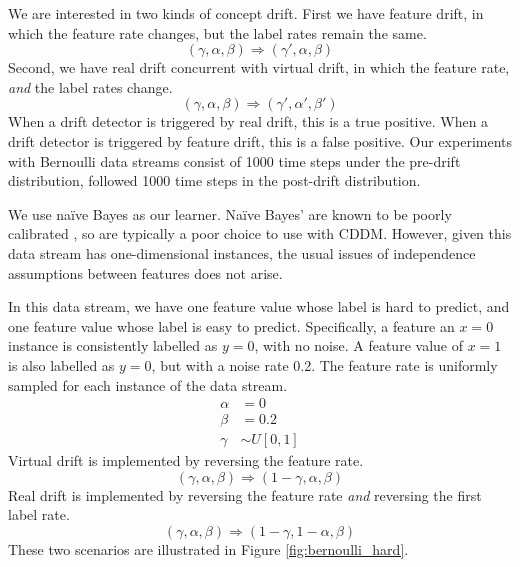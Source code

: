 We are interested in two kinds of concept drift. First we have feature drift, in which the feature rate changes, but the label rates remain the same.
\begin{equation}
  (\gamma,\alpha,\beta) \Rightarrow (\gamma',\alpha,\beta)
\end{equation}
Second, we have real drift concurrent with virtual drift, in which the feature rate, {\it and} the label rates change. 
\begin{equation}
  (\gamma,\alpha,\beta) \Rightarrow (\gamma',\alpha',\beta')
\end{equation}
When a drift detector is triggered by real drift, this is a true positive. When a drift detector is triggered by feature drift, this is a false positive. Our experiments with Bernoulli data streams consist of 1000 time steps under the pre-drift distribution, followed 1000 time steps in the post-drift distribution. %

We use na\"{i}ve Bayes as our learner. Na\"{i}ve Bayes' are known to be poorly calibrated \cite{calibrating}, so are typically a poor choice to use with CDDM. However, given this data stream has one-dimensional instances, the usual issues of independence assumptions between features does not arise. %

In this data stream, we have one feature value whose label is hard to predict, and one feature value whose label is easy to predict. Specifically, a feature an $x=0$ instance is consistently labelled as $y=0$, with no noise. A feature value of $x=1$ is also labelled as $y=0$, but with a noise rate 0.2. The feature rate is uniformly sampled for each instance of the data stream.
\begin{align}
  \alpha &= 0 \\
  \beta &= 0.2 \\
  \gamma &\sim U[0,1]
\end{align}
Virtual drift is implemented by reversing the feature rate. 
\begin{equation}
  (\gamma,\alpha,\beta) \Rightarrow (1-\gamma,\alpha,\beta)
\end{equation}
Real drift is implemented by reversing the feature rate {\it and} reversing the first label rate.
\begin{equation}
  (\gamma,\alpha,\beta) \Rightarrow (1-\gamma,1-\alpha,\beta)
\end{equation}
These two scenarios are illustrated in Figure \ref{fig:bernoulli_hard}.

